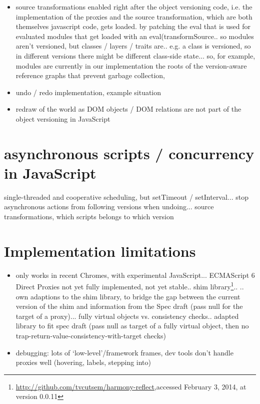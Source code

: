 \begin{itemize}
    \item source transformations enabled right after the object versioning code, i.e. the implementation of the proxies and the source transformation, which are both themselves javascript code, gets loaded. by patching the eval that is used for evaluated modules that get loaded with an eval(transformSource.. so modules aren’t versioned, but classes / layers / traits are.. e.g. a class is versioned, so in different versions there might be different class-side state... so, for example, modules are currently in our implementation the roots of the version-aware reference graphs that prevent garbage collection, 
\end{itemize}


\begin{itemize}
    \item undo / redo implementation, example situation
    \item redraw of the world as DOM objects / DOM relations are not part of the object versioning in JavaScript
\end{itemize}




\section{asynchronous scripts / concurrency in JavaScript}

single-threaded and cooperative scheduling, but setTimeout / setInterval... stop asynchronous actions from following versions when undoing... source transformations, which scripts belongs to which version




\section{Implementation limitations}

\begin{itemize}
    \item only works in recent Chromes, with experimental JavaScript... ECMAScript 6 Direct Proxies not yet fully implemented, not yet stable.. shim library\footnote{\url{http://github.com/tvcutsem/harmony-reflect},\goodbreak accessed February 3, 2014, at version 0.0.11}..
.. own adaptions to the shim library, to bridge the gap between the current version of the shim and information from the Spec draft (pass null for the target of a proxy)... fully virtual objects vs. consistency checks.. adapted library to fit spec draft (pass null as target of a fully virtual object, then no trap-return-value-consistency-with-target checks)
\end{itemize}
    


\begin{itemize}
    \item debugging: lots of ‘low-level’/framework frames, dev tools don’t handle proxies well (hovering, labels, stepping into)
\end{itemize}

